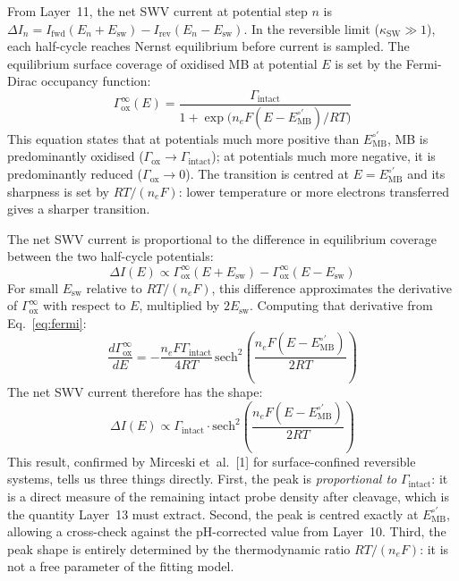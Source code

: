 \documentclass[10pt,a4paper]{article}
\numberwithin{equation}{section}
\newcommand{\cit}[1]{[#1]}
\newcommand{\Eo}{E^{\circ\prime}}
\newcommand{\Esw}{E_{\text{sw}}}
\newcommand{\DI}{\Delta I}
\begin{document}
From Layer~11, the net SWV current at potential step $n$ is
$\DI_n = I_\text{fwd}(E_n + \Esw) - I_\text{rev}(E_n - \Esw)$. In the
reversible limit ($\kappa_\text{SW} \gg 1$), each half-cycle reaches Nernst
equilibrium before current is sampled. The equilibrium surface coverage of
oxidised MB at potential $E$ is set by the Fermi-Dirac occupancy function:
\begin{equation}
  \Gamma_\text{ox}^\infty(E) = \frac{\Gamma_\text{intact}}{1 +
  \exp\!\bigl(n_e F(E - \Eo_\text{MB})/RT\bigr)}
  \label{eq:fermi}
\end{equation}
This equation states that at potentials much more positive than $\Eo_\text{MB}$,
MB is predominantly oxidised ($\Gamma_\text{ox} \to \Gamma_\text{intact}$);
at potentials much more negative, it is predominantly reduced
($\Gamma_\text{ox} \to 0$). The transition is centred at $E = \Eo_\text{MB}$
and its sharpness is set by $RT/(n_e F)$: lower temperature or more electrons
transferred gives a sharper transition.

The net SWV current is proportional to the difference in equilibrium coverage
between the two half-cycle potentials:
\begin{equation}
  \DI(E) \propto \Gamma_\text{ox}^\infty(E + \Esw)
  - \Gamma_\text{ox}^\infty(E - \Esw)
  \label{eq:DI_diff}
\end{equation}
For small $\Esw$ relative to $RT/(n_e F)$, this difference approximates the
derivative of $\Gamma_\text{ox}^\infty$ with respect to $E$, multiplied by
$2\Esw$. Computing that derivative from Eq.~\eqref{eq:fermi}:
\begin{equation}
  \frac{d\Gamma_\text{ox}^\infty}{dE}
  = -\frac{n_e F \Gamma_\text{intact}}{4RT}\,
  \text{sech}^2\!\!\left(\frac{n_e F (E - \Eo_\text{MB})}{2RT}\right)
  \label{eq:deriv}
\end{equation}
The net SWV current therefore has the shape:
\begin{equation}
  \boxed{
  \DI(E) \propto \Gamma_\text{intact} \cdot
  \text{sech}^2\!\!\left(\frac{n_e F(E - \Eo_\text{MB})}{2RT}\right)
  }
  \label{eq:sech2}
\end{equation}
This result, confirmed by Mirceski et~al.~\cit{1} for surface-confined
reversible systems, tells us three things directly. First, the peak is
\emph{proportional to} $\Gamma_\text{intact}$: it is a direct measure of the
remaining intact probe density after cleavage, which is the quantity Layer~13
must extract. Second, the peak is centred exactly at $\Eo_\text{MB}$, allowing
a cross-check against the pH-corrected value from Layer~10. Third, the peak
shape is entirely determined by the thermodynamic ratio $RT/(n_e F)$: it is
not a free parameter of the fitting model.
\end{document}
